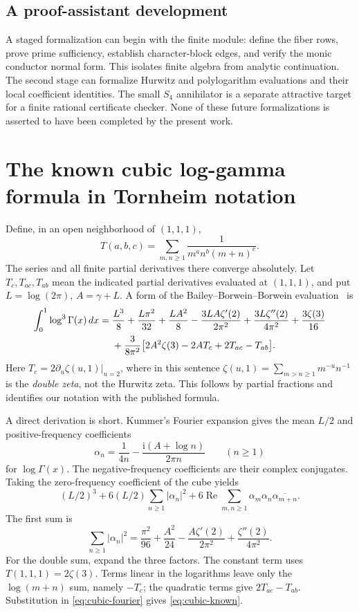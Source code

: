 \documentclass[11pt]{article}
\numberwithin{equation}{section}
\theoremstyle{definition}
\theoremstyle{remark}
\DeclareMathOperator{\Ree}{Re}
\newcommand{\ii}{\mathrm i}
\begin{document}
\subsection{A proof-assistant development}
A staged formalization can begin with the finite module: define the
fiber rows, prove prime sufficiency, establish character-block edges,
and verify the monic conductor normal form. This isolates finite
algebra from analytic continuation. The second stage can formalize
Hurwitz and polylogarithm evaluations and their local coefficient
identities. The small $S_4$ annihilator is a separate attractive target
for a finite rational certificate checker. None of these future
formalizations is asserted to have been completed by the present work.

\clearpage
\appendix
\section{The known cubic log-gamma formula in Tornheim notation}\label{app:cubic}

Define, in an open neighborhood of $(1,1,1)$,
\[
 T(a,b,c)=\sum_{m,n\ge1}\frac1{m^a n^b(m+n)^c}.
\]
The series and all finite partial derivatives there converge
absolutely. Let $T_c,T_{ac},T_{ab}$ mean the indicated partial
derivatives evaluated at $(1,1,1)$, and put
$L=\log(2\pi)$, $A=\gamma+L$. A form of the
Bailey--Borwein--Borwein evaluation~\cite[Eq.~(11), Theorem~6]{bbb} is
\begin{align}\label{eq:cubic-known}
 \int_0^1\log^3\Gamma(x)\,dx
 ={}&\frac{L^3}{8}+\frac{L\pi^2}{32}+\frac{LA^2}{8}
 -\frac{3LA\zeta'(2)}{2\pi^2}
 +\frac{3L\zeta''(2)}{4\pi^2}+\frac{3\zeta(3)}{16}\notag\\
 &+\frac3{8\pi^2}
 \bigl[2A^2\zeta(3)-2AT_c+2T_{ac}-T_{ab}\bigr].
\end{align}
Here $T_c=2\partial_u\zeta(u,1)|_{u=2}$, where in this sentence
$\zeta(u,1)=\sum_{m>n\ge1}m^{-u}n^{-1}$ is the \emph{double zeta},
not the Hurwitz zeta. This follows by partial fractions and identifies
our notation with the published formula.

A direct derivation is short. Kummer's Fourier expansion gives the
mean $L/2$ and positive-frequency coefficients
\[
 \alpha_n=\frac1{4n}-\frac{\ii(A+\log n)}{2\pi n}
 \qquad(n\ge1)
\]
for $\log\Gamma(x)$. The negative-frequency coefficients are their
complex conjugates. Taking the zero-frequency coefficient of the
cube yields
\begin{equation}\label{eq:cubic-fourier}
 (L/2)^3+6(L/2)\sum_{n\ge1}|\alpha_n|^2
 +6\Ree\sum_{m,n\ge1}\alpha_m\alpha_n
 \overline{\alpha_{m+n}}.
\end{equation}
The first sum is
\[
 \sum_{n\ge1}|\alpha_n|^2
 =\frac{\pi^2}{96}+\frac{A^2}{24}
 -\frac{A\zeta'(2)}{2\pi^2}+\frac{\zeta''(2)}{4\pi^2}.
\]
For the double sum, expand the three factors. The constant term uses
$T(1,1,1)=2\zeta(3)$. Terms linear in the logarithms leave only the
$\log(m+n)$ sum, namely $-T_c$; the quadratic terms give
$2T_{ac}-T_{ab}$. Substitution in \eqref{eq:cubic-fourier} gives
\eqref{eq:cubic-known}.
\end{document}
